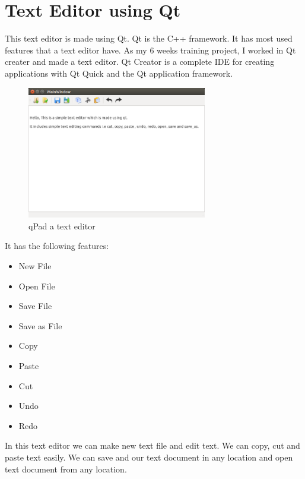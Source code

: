 \section{Text Editor using Qt}
This text editor is made using Qt. Qt is the C++ framework. It has most used features that a text editor have. 
\noindent As my 6 weeks training project,  I worked  in Qt creater and made a text editor.
Qt Creator is a complete IDE for creating applications with Qt Quick and the Qt application framework.
\begin{figure}[!ht]
\centering
\includegraphics[width=0.7\textwidth]{images/qpad.png} 
\caption{qPad a text editor}
\end{figure}

It has the following features:
\begin{itemize}
\item New File
\item Open File
\item Save File
\item Save as File
\item Copy
\item Paste
\item Cut
\item Undo
\item Redo
\end{itemize}



In this text editor we can make new text file and edit text. We can copy, cut and paste text easily. We can save and our text document in any location and open text document from any location. 

